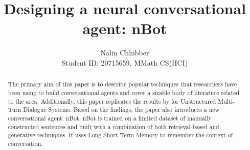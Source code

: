 \documentclass[letterpaper] {article} %
\begin{document}
%
\title{Designing a neural conversational agent: nBot}
\author{Nalin Chhibber\\ Student ID: 20715659, MMath CS(HCI)}
\maketitle
\begin{abstract}
The primary aim of this paper is to describe popular techniques that researchers have been using to build conversational agents and cover a sizable body of literature related to the area. Additionally, this paper replicates the results by \cite{lowe2015ubuntu} for Unstructured Multi-Turn Dialogue Systems. Based on the findings, the paper also introduces a new conversational agent: nBot. nBot is trained on a limited dataset of manually constructed sentences and built with a combination of both retrieval-based and generative techniques. It uses Long Short Term Memory to remember the context of conversation.
\end{abstract}
\end{document}
